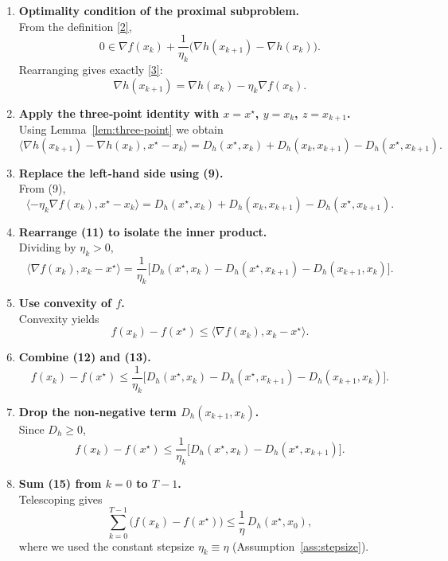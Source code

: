 \documentclass[11pt]{article}
\begin{document}
\begin{enumerate}[label=[Step \arabic*], leftmargin=*, align=left]
\item \textbf{Optimality condition of the proximal subproblem.}\\
From the definition \eqref{2},
\[
0\in \nabla f(x_{k})+\frac{1}{\eta_{k}}\big(\nabla h(x_{k+1})-\nabla h(x_{k})\big).
\]
Rearranging gives exactly \eqref{3}:
\[
\nabla h(x_{k+1})=\nabla h(x_{k})-\eta_{k}\nabla f(x_{k}). \tag{9}
\]

\item \textbf{Apply the three‑point identity with $x=x^{\star}$,
$y=x_{k}$, $z=x_{k+1}$.}\\
Using Lemma~\ref{lem:three-point} we obtain
\[
\langle \nabla h(x_{k+1})-\nabla h(x_{k}),x^{\star}-x_{k}\rangle
= D_{h}(x^{\star},x_{k})+D_{h}(x_{k},x_{k+1})-D_{h}(x^{\star},x_{k+1}). \tag{10}
\]

\item \textbf{Replace the left‑hand side using (9).}\\
From (9),
\[
\langle -\eta_{k}\nabla f(x_{k}),x^{\star}-x_{k}\rangle
= D_{h}(x^{\star},x_{k})+D_{h}(x_{k},x_{k+1})-D_{h}(x^{\star},x_{k+1}). \tag{11}
\]

\item \textbf{Rearrange (11) to isolate the inner product.}\\
Dividing by $\eta_{k}>0$,
\[
\langle \nabla f(x_{k}),x_{k}-x^{\star}\rangle
=\frac{1}{\eta_{k}}\big[ D_{h}(x^{\star},x_{k})-D_{h}(x^{\star},x_{k+1})
- D_{h}(x_{k+1},x_{k})\big]. \tag{12}
\]

\item \textbf{Use convexity of $f$.}\\
Convexity yields
\[
f(x_{k})-f(x^{\star})\le \langle \nabla f(x_{k}),x_{k}-x^{\star}\rangle.
\tag{13}
\]

\item \textbf{Combine (12) and (13).}\\
\[
f(x_{k})-f(x^{\star})
\le \frac{1}{\eta_{k}}\big[ D_{h}(x^{\star},x_{k})-D_{h}(x^{\star},x_{k+1})
- D_{h}(x_{k+1},x_{k})\big]. \tag{14}
\]

\item \textbf{Drop the non‑negative term $D_{h}(x_{k+1},x_{k})$.}\\
Since $D_{h}\ge0$,
\[
f(x_{k})-f(x^{\star})
\le \frac{1}{\eta_{k}}\big[ D_{h}(x^{\star},x_{k})-D_{h}(x^{\star},x_{k+1})\big].
\tag{15}
\]

\item \textbf{Sum (15) from $k=0$ to $T-1$.}\\
Telescoping gives
\[
\sum_{k=0}^{T-1}\big(f(x_{k})-f(x^{\star})\big)
\le \frac{1}{\eta}\,D_{h}(x^{\star},x_{0}), \tag{16}
\]
where we used the constant stepsize $\eta_{k}\equiv\eta$ (Assumption~\ref{ass:stepsize}).


\end{enumerate}
\end{document}
